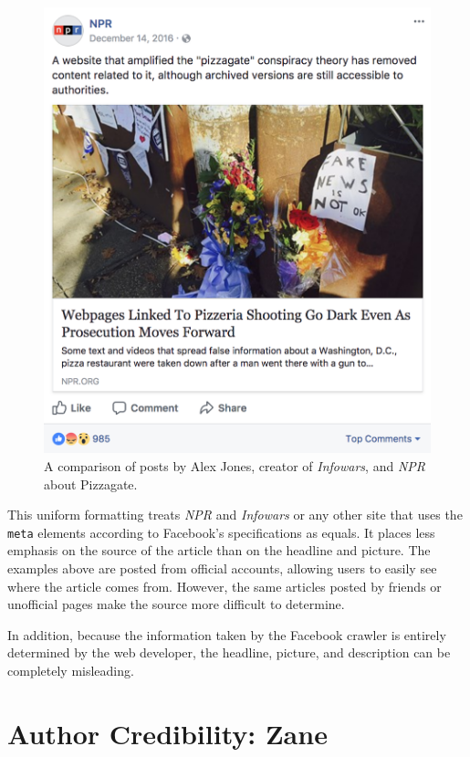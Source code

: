 \documentclass[12pt]{article}
\begin{document}
\begin{figure}[h]
\begin{minipage}{0.48\textwidth}
		\includegraphics[scale=.3]{pizzagate_npr_fb}
	\end{minipage}
	\caption{A comparison of posts by Alex Jones, creator of {\it Infowars}, \cite{alex_jones_pizzagate_post} and {\it NPR} \cite{npr_pizzagate_post} about Pizzagate.}
\end{figure}

This uniform formatting treats {\it NPR} and {\it Infowars} or any other site that uses the \texttt{meta} elements according to Facebook's specifications as equals. It places less emphasis on the source of the article than on the headline and picture. The examples above are posted from official accounts, allowing users to easily see where the article comes from. However, the same articles posted by friends or unofficial pages make the source more difficult to determine.

In addition, because the information taken by the Facebook crawler is entirely determined by the web developer, the headline, picture, and description can be completely misleading.



\section{Author Credibility: Zane}
\end{document}
